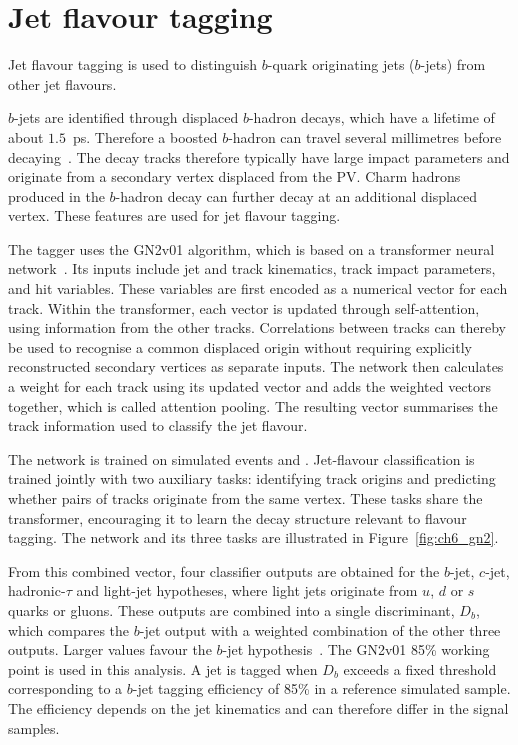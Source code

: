 \section{Jet flavour tagging}
\label{sec:ch6_btag}

Jet flavour tagging is used to distinguish $b$-quark originating jets ($b$-jets) from other jet flavours.

$b$-jets are identified through displaced $b$-hadron decays, which have a lifetime of about $1.5$~ps. Therefore a boosted $b$-hadron can travel several millimetres before decaying~\cite{ATLAS2026GN2}.
The decay tracks therefore typically have large impact parameters and originate from a secondary vertex displaced from the PV.
Charm hadrons produced in the $b$-hadron decay can further decay at an additional displaced vertex.
These features are used for jet flavour tagging.

The tagger uses the GN2v01 algorithm, which is based on a transformer neural network~\cite{ATLAS2026GN2}.
Its inputs include jet and track kinematics, track impact parameters, and hit variables.
These variables are first encoded as a numerical vector for each track.
Within the transformer, each vector is updated through self-attention, using information from the other tracks.
Correlations between tracks can thereby be used to recognise a common displaced origin without requiring explicitly reconstructed secondary vertices as separate inputs.
The network then calculates a weight for each track using its updated vector and adds the weighted vectors together, which is called attention pooling.
The resulting vector summarises the track information used to classify the jet flavour.

The network is trained on simulated events and .
Jet-flavour classification is trained jointly with two auxiliary tasks: identifying track origins and predicting whether pairs of tracks originate from the same vertex.
These tasks share the transformer, encouraging it to learn the decay structure relevant to flavour tagging.
The network and its three tasks are illustrated in Figure~\ref{fig:ch6_gn2}.

From this combined vector, four classifier outputs are obtained for the $b$-jet, $c$-jet, hadronic-$\tau$ and light-jet hypotheses, where light jets originate from $u$, $d$ or $s$ quarks or gluons.
These outputs are combined into a single discriminant, $D_b$, which compares the $b$-jet output with a weighted combination of the other three outputs.
Larger values favour the $b$-jet hypothesis~\cite{ATLAS2026GN2}.
The GN2v01 85\% working point is used in this analysis.
A jet is tagged when $D_b$ exceeds a fixed threshold corresponding to a $b$-jet tagging efficiency of 85\% in a reference simulated sample.
The efficiency depends on the jet kinematics and can therefore differ in the signal samples.

